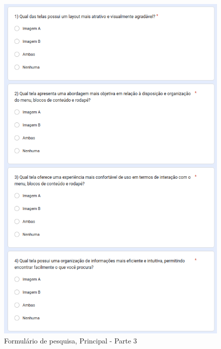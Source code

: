 \begin{figure}[!h]
	\begin{center}
	    \includegraphics[scale=0.6]{figs/Form/15.png}
	\end{center}
	\caption{\label{AP_PP03}Formulário de pesquisa, Principal - Parte 3}
\end{figure}

\newpage

